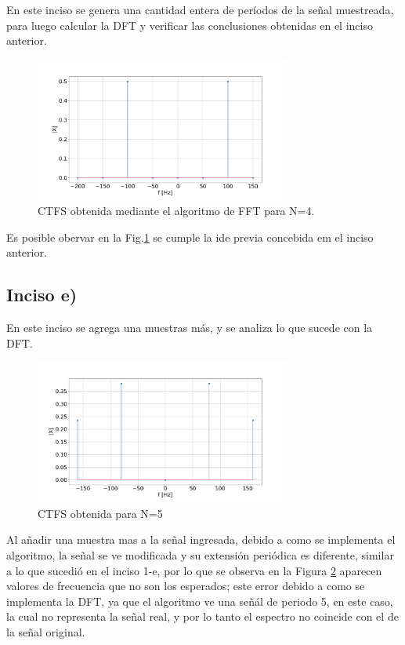 \documentclass{article}
\begin{document}
    En este inciso se genera una cantidad entera de períodos de la señal muestreada,
    para luego calcular la DFT y verificar las conclusiones obtenidas en el inciso anterior.

    \begin{figure}[H]
        \centering
        \includegraphics[width=0.75\textwidth]{Img/punto_2_d.png}
        \caption{CTFS obtenida mediante el algoritmo de FFT para N=4.}
        \label{fig.2d}
    \end{figure}
    Es posible obervar en la Fig.\ref{fig.2d} se cumple la ide previa concebida em el inciso anterior.
    
    \subsection*{Inciso e)}

    En este inciso se agrega una muestras más, y se analiza lo que sucede con la DFT.

    \begin{figure}[H]
        \centering
        \includegraphics[width=0.75\textwidth]{Img/punto_2_e.png}
        \caption{CTFS obtenida para N=5}
        \label{fig.2e}
    \end{figure}

    Al añadir una muestra mas a la señal ingresada, debido a como se implementa el algoritmo, la señal se ve modificada y su 
    extensión periódica es diferente, similar a lo que sucedió en el inciso 1-e, por lo que se observa en la Figura \ref{fig.2e} aparecen valores de frecuencia que no son los esperados; este error debido a como se implementa la DFT, ya que el algoritmo ve una señál de periodo 5, en este caso, la cual no representa la señal real, y por lo tanto el espectro no coincide con el de la señal original.
\end{document}
